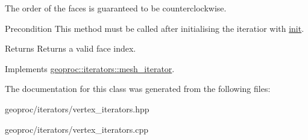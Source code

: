 The order of the faces is guaranteed to be counterclockwise.

\begin{DoxyPrecond}{Precondition}
This method must be called after initialising the iteratior with \hyperlink{classgeoproc_1_1iterators_1_1vertex_1_1vertex__face__iterator_a713d8d9edb7121c729b5717261fd8b3b}{init}. 
\end{DoxyPrecond}
\begin{DoxyReturn}{Returns}
Returns a valid face index. 
\end{DoxyReturn}


Implements \hyperlink{classgeoproc_1_1iterators_1_1mesh__iterator_a32f1ddc2f83743a2b0a4633506601cfe}{geoproc\+::iterators\+::mesh\+\_\+iterator}.



The documentation for this class was generated from the following files\+:\begin{DoxyCompactItemize}
\item 
geoproc/iterators/vertex\+\_\+iterators.\+hpp\item 
geoproc/iterators/vertex\+\_\+iterators.\+cpp\end{DoxyCompactItemize}
